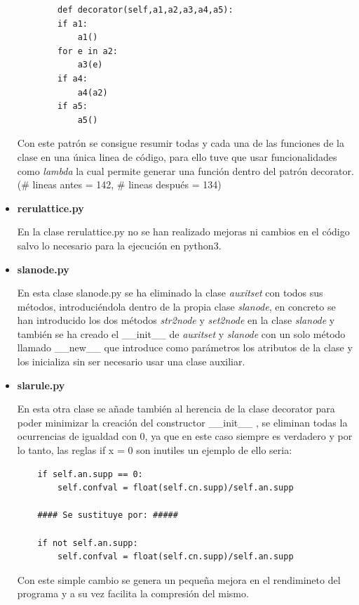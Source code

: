\documentclass{cosas/tfg_domingo}
\begin{document}
\begin{itemize}
\begin{verbatim}
        def decorator(self,a1,a2,a3,a4,a5):
        if a1:
            a1()
        for e in a2:
            a3(e)
        if a4:
            a4(a2)
        if a5:
            a5()
\end{verbatim}

Con este patrón se consigue resumir todas y cada una de las funciones de la clase en una única linea de código, para ello tuve que usar funcionalidades como \textit{lambda} la cual permite generar una función dentro del patrón decorator. (\# lineas antes = 142, \# lineas después = 134)

\item \textbf{rerulattice.py}

En la clase rerulattice.py no se han realizado mejoras ni cambios en el código salvo lo necesario para la ejecución en python3.

\item \textbf{slanode.py}

En esta clase slanode.py se ha eliminado la clase \textit{auxitset} con todos sus métodos, introduciéndola dentro de la propia clase \textit{slanode}, en concreto se han introducido los dos métodos \textit{str2node} y \textit{set2node} en la clase \textit{slanode} y también se ha creado el \_\_init\_\_ de \textit{auxitset} y \textit{slanode} con un solo método llamado \_\_new\_\_ que introduce como parámetros los atributos de la clase y los inicializa sin ser necesario usar una clase auxiliar.

\item \textbf{slarule.py}

En esta otra clase se añade también al herencia de la clase decorator para poder minimizar la creación del constructor \_\_init\_\_ , se eliminan todas la ocurrencias de igualdad con 0, ya que en este caso siempre es verdadero y por lo tanto, las reglas if x = 0 son inutiles un ejemplo de ello seria:

\begin{verbatim}
    if self.an.supp == 0:
        self.confval = float(self.cn.supp)/self.an.supp
        
    #### Se sustituye por: #####
    
    if not self.an.supp:
        self.confval = float(self.cn.supp)/self.an.supp
\end{verbatim}

Con este simple cambio se genera un pequeña mejora en el rendimineto del programa y a su vez facilita la compresión del mismo.


\end{itemize}
\end{document}
